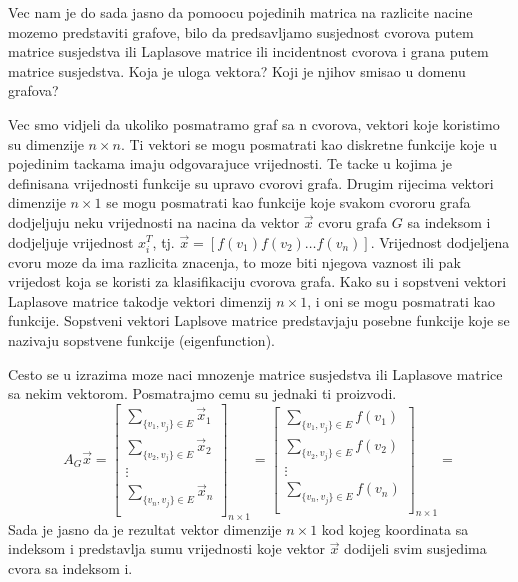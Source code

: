\documentclass[11pt]{article}
\begin{document}
	Vec nam je do sada jasno da pomoocu pojedinih matrica na razlicite nacine mozemo predstaviti grafove, bilo da predsavljamo susjednost cvorova putem matrice
	susjedstva ili Laplasove matrice ili incidentnost cvorova i grana putem matrice susjedstva. Koja je uloga vektora? Koji je njihov smisao u domenu grafova?
	
	Vec smo vidjeli da ukoliko posmatramo graf sa n cvorova, vektori koje koristimo su dimenzije $n \times n$. Ti vektori se mogu posmatrati kao diskretne funkcije koje
	u pojedinim tackama imaju odgovarajuce vrijednosti. Te tacke u kojima je definisana vrijednosti funkcije su upravo cvorovi grafa. Drugim rijecima vektori dimenzije
	$n \times 1$ se mogu posmatrati kao funkcije koje svakom cvororu grafa dodjeljuju neku vrijednosti na nacina da vektor $\vec{x}$ cvoru grafa $G$ sa indeksom i dodjeljuje
	vrijednost $x_i^T$, tj. $\vec{x} = [ f(v_1) f(v_2) \dots f(v_n)]$. Vrijednost dodjeljena cvoru moze da ima razlicita znacenja, to moze biti njegova vaznost ili pak 
	vrijedost koja se koristi za klasifikaciju cvorova grafa. Kako su i sopstveni vektori Laplasove matrice takodje vektori dimenzij $n \times 1$, i oni se mogu posmatrati
	kao funkcije. Sopstveni vektori Laplsove matrice predstavjaju posebne funkcije koje se nazivaju sopstvene funkcije (eigenfunction).

	Cesto se u izrazima moze naci mnozenje matrice susjedstva ili Laplasove matrice sa nekim vektorom. Posmatrajmo cemu su jednaki ti proizvodi.
	\[
	A_G \vec{x} = 
	\begin{bmatrix}
		\sum_{\{v_1,v_j\} \in E} \vec{x}_1 \\
		\sum_{\{v_2,v_j\} \in E} \vec{x}_2 \\
		\vdots \\
		\sum_{\{v_n,v_j\} \in E} \vec{x}_n \\
	\end{bmatrix}_{n \times 1} =
	\begin{bmatrix}
		\sum_{\{v_1,v_j\} \in E} f(v_1) \\
		\sum_{\{v_2,v_j\} \in E} f(v_2) \\
		\vdots \\
		\sum_{\{v_n,v_j\} \in E} f(v_n) \\
	\end{bmatrix}_{n \times 1} =
	\]
	Sada je jasno da je rezultat vektor dimenzije $n \times 1$ kod kojeg koordinata sa indeksom i predstavlja sumu vrijednosti koje vektor $\vec{x}$ dodijeli svim
	susjedima cvora sa indeksom i.
	
\end{document}
